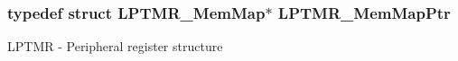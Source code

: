 \subsubsection[{\texorpdfstring{L\+P\+T\+M\+R\+\_\+\+Mem\+Map\+Ptr}{LPTMR_MemMapPtr}}]{\setlength{\rightskip}{0pt plus 5cm}typedef struct {\bf L\+P\+T\+M\+R\+\_\+\+Mem\+Map}$\ast$ {\bf L\+P\+T\+M\+R\+\_\+\+Mem\+Map\+Ptr}}\hypertarget{group___l_p_t_m_r___peripheral_ga765226e2eeb35160c12820d4a2541320}{}\label{group___l_p_t_m_r___peripheral_ga765226e2eeb35160c12820d4a2541320}
L\+P\+T\+MR -\/ Peripheral register structure 